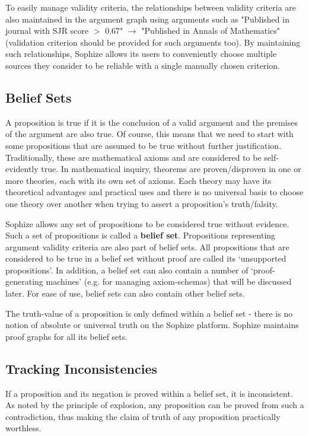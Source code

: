 \documentclass[runningheads]{llncs}
\begin{document}
To easily manage validity criteria, the relationships between validity criteria are also maintained in the argument graph using arguments such as "Published in journal with SJR score $>$ 0.67" $\rightarrow$ "Published in Annals of Mathematics" (validation criterion should be provided for such arguments too). By maintaining such relationships, Sophize allows its users to conveniently choose multiple sources they consider to be reliable with a single manually chosen criterion. 

\subsection{Belief Sets}
\label{sec:bset}

A proposition is true if it is the conclusion of a valid argument and the premises of the argument are also true. Of course, this means that we need to start with some propositions that are assumed to be true without further justification. Traditionally, these are mathematical axioms and are considered to be self-evidently true. In mathematical inquiry, theorems are proven/disproven in one or more theories, each with its own set of axioms. Each theory may have its theoretical advantages and practical uses and there is no universal basis to choose one theory over another when trying to assert a proposition's truth/falsity.

Sophize allows any set of propositions to be considered true without evidence. Such a set of propositions is called a \textbf{belief set}. Propositions representing argument validity criteria are also part of belief sets. All propositions that are considered to be true in a belief set without proof are called its `unsupported propositions'. In addition, a belief set can also contain a number of `proof-generating machines' (e.g. for managing axiom-schemas) that will be discussed later. For ease of use, belief sets can also contain other belief sets.

The truth-value of a proposition is only defined within a belief set - there is no notion of absolute or universal truth on the Sophize platform. Sophize maintains proof graphs for all its belief sets.

\subsection{Tracking Inconsistencies}
If a proposition and its negation is proved within a belief set, it is inconsistent. As noted by the principle of explosion, any proposition can be proved from such a contradiction, thus making the claim of truth of any proposition practically worthless.
\end{document}
